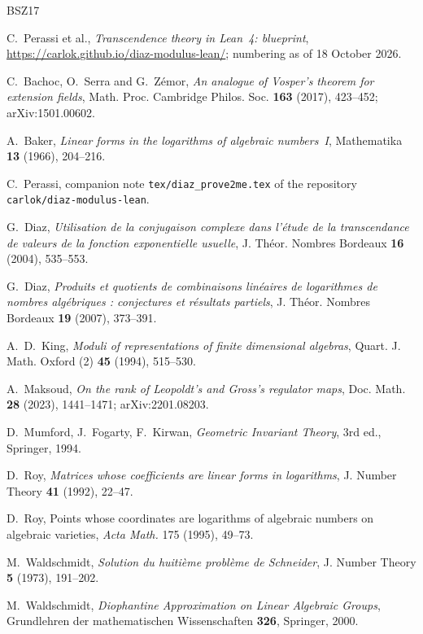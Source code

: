 \documentclass[11pt,a4paper]{article}
\theoremstyle{plain}
\theoremstyle{definition}
\begin{document}
\begin{thebibliography}{BSZ17}

C.~Perassi et al., \emph{Transcendence theory in Lean~4: blueprint},
\url{https://carlok.github.io/diaz-modulus-lean/}; numbering as of 18 October 2026.

C.~Bachoc, O.~Serra and G.~Z\'emor, \emph{An analogue of Vosper's theorem for extension
fields}, Math. Proc. Cambridge Philos. Soc. \textbf{163} (2017), 423--452;
arXiv:1501.00602.

A.~Baker, \emph{Linear forms in the logarithms of algebraic numbers~I}, Mathematika
\textbf{13} (1966), 204--216.

C.~Perassi, companion note \texttt{tex/diaz\_prove2me.tex} of the repository
\texttt{carlok/diaz-modulus-lean}.

G.~Diaz, \emph{Utilisation de la conjugaison complexe dans l'\'etude de la transcendance
de valeurs de la fonction exponentielle usuelle}, J. Th\'eor. Nombres Bordeaux
\textbf{16} (2004), 535--553.

G.~Diaz, \emph{Produits et quotients de combinaisons lin\'eaires de logarithmes de
nombres alg\'ebriques : conjectures et r\'esultats partiels}, J. Th\'eor. Nombres
Bordeaux \textbf{19} (2007), 373--391.

A.~D.~King, \emph{Moduli of representations of finite dimensional algebras}, Quart. J. Math.
Oxford (2) \textbf{45} (1994), 515--530.

A.~Maksoud, \emph{On the rank of Leopoldt's and Gross's regulator maps}, Doc. Math.
\textbf{28} (2023), 1441--1471; arXiv:2201.08203.

D.~Mumford, J.~Fogarty, F.~Kirwan, \emph{Geometric Invariant Theory}, 3rd ed., Springer, 1994.

D.~Roy, \emph{Matrices whose coefficients are linear forms in logarithms}, J. Number
Theory \textbf{41} (1992), 22--47.

D.~Roy, Points whose coordinates are logarithms of algebraic numbers on algebraic varieties, \emph{Acta Math.} 175 (1995), 49--73.

M.~Waldschmidt, \emph{Solution du huiti\`eme probl\`eme de Schneider}, J. Number Theory
\textbf{5} (1973), 191--202.

M.~Waldschmidt, \emph{Diophantine Approximation on Linear Algebraic Groups},
Grundlehren der mathematischen Wissenschaften \textbf{326}, Springer, 2000.

\end{thebibliography}
\end{document}
